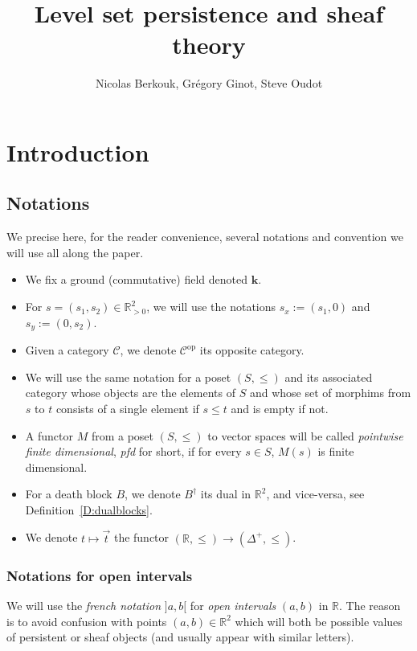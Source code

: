 \documentclass[a4paper, english, 11pt]{article}
\author{Nicolas Berkouk, Grégory Ginot, Steve Oudot}
\newcommand{\kk}[0]{\textbf{k}}
\newcommand{\0}{\vec{0}}
\newcommand{\R}[0]{\mathbb{R}}
\newcommand{\C}[0]{\mathcal{C}}
\newcommand{\op}[0]{\text{op}}
\begin{document}

\title{Level set persistence and sheaf theory}
\maketitle
\begin{abstract}
   
\end{abstract}

\tableofcontents

\section{Introduction}

\subsection{Notations}
We precise here, for the reader convenience, several notations and convention we will use all along the paper.
\begin{itemize}
\item We fix a ground (commutative) field denoted $\kk$.
    \item For $s=(s_1,s_2)\in \R^2_{>0}$, we will use the notations $s_x:=(s_1,0)$ and $s_y := (0,s_2)$.
    \item Given a category $\C$, we denote $\C^{\op}$ its opposite category. 
    \item We will use the same notation for a poset $(S, \leq)$ and its associated  category whose objects are the elements of $S$ and whose set of morphims from  $s$ to $t$ consists of a single element if $s\leq t$ and is empty if not.
    \item A functor $M$ from a poset $(S, \leq)$ to vector spaces will be called \emph{pointwise finite dimensional}, \emph{pfd} for short, if for every $s\in S$, $M(s)$ is finite dimensional. 
    \item For a death block $B$, we denote $B^\dag$ its dual  in $\R^2$, and vice-versa, see Definition~\ref{D:dualblocks}.
    \item We denote $t\mapsto \vec{t}$ the functor $(\R ,\leq) \to (\Delta^+, \leq)$.
\end{itemize}
\subsubsection{Notations for open intervals} We will use the \emph{french notation} $]a,b[$ for \emph{open intervals} $(a,b)$ in $\R$. The reason is to avoid confusion with points $(a,b)\in \R^2$ which will both be possible values of persistent or sheaf objects (and usually appear with similar letters).
    
\end{document}
